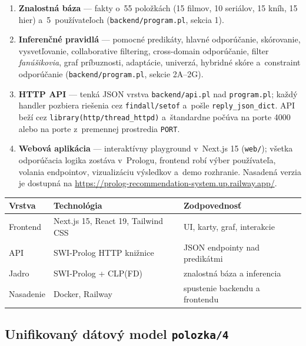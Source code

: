 \documentclass[11pt,a4paper]{article}
\begin{document}
\begin{enumerate}[noitemsep]
  \item \textbf{Znalostná báza} --- fakty o~55 položkách
        (15 filmov, 10 seriálov, 15 kníh, 15 hier) a~5~používateľoch
        (\texttt{backend/program.pl}, sekcia 1).
  \item \textbf{Inferenčné pravidlá} --- pomocné predikáty,
        hlavné odporúčanie, skórovanie, vysvetľovanie,
        collaborative filtering, cross-domain odporúčanie, filter
        \emph{fanúšikovia}, graf príbuznosti, adaptácie,
        univerzá, hybridné skóre a~constraint odporúčanie
        (\texttt{backend/program.pl}, sekcie 2A--2G).
  \item \textbf{HTTP API} --- tenká JSON vrstva
        \texttt{backend/api.pl} nad \texttt{program.pl}; každý
        handler pozbiera riešenia cez \texttt{findall/setof}
        a~pošle \texttt{reply\_json\_dict}. API beží cez
        \texttt{library(http/thread\_httpd)} a~štandardne počúva
        na porte 4000 alebo na porte z~premennej prostredia
        \texttt{PORT}.
  \item \textbf{Webová aplikácia} --- interaktívny playground
        v~Next.js 15 (\texttt{web/}); všetka odporúčacia logika
        zostáva v~Prologu, frontend robí výber používateľa,
        volania endpointov, vizualizáciu výsledkov a~demo
        rozhranie. Nasadená verzia je dostupná na
        \url{https://prolog-recommendation-system.up.railway.app/}.
\end{enumerate}

\begin{center}
\begin{tabular}{lll}
\toprule
\textbf{Vrstva} & \textbf{Technológia} & \textbf{Zodpovednosť}\\
\midrule
Frontend & Next.js 15, React 19, Tailwind CSS & UI, karty, graf, interakcie\\
API & SWI-Prolog HTTP knižnice & JSON endpointy nad predikátmi\\
Jadro & SWI-Prolog + CLP(FD) & znalostná báza a inferencia\\
Nasadenie & Docker, Railway & spustenie backendu a frontendu\\
\bottomrule
\end{tabular}
\end{center}

\subsection{Unifikovaný dátový model \texttt{polozka/4}}
\label{sec:dm}
\end{document}
